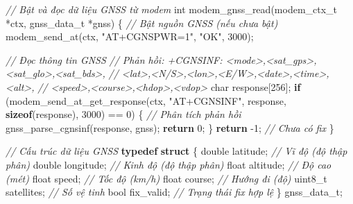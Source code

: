 \documentclass[a4paper]{extarticle}
\newenvironment{Shaded}{}{}
\newcommand{\CommentTok}[1]{\textcolor[rgb]{0.38,0.63,0.69}{\textit{#1}}}
\newcommand{\ControlFlowTok}[1]{\textcolor[rgb]{0.00,0.44,0.13}{\textbf{#1}}}
\newcommand{\DataTypeTok}[1]{\textcolor[rgb]{0.56,0.13,0.00}{#1}}
\newcommand{\DecValTok}[1]{\textcolor[rgb]{0.25,0.63,0.44}{#1}}
\newcommand{\KeywordTok}[1]{\textcolor[rgb]{0.00,0.44,0.13}{\textbf{#1}}}
\newcommand{\NormalTok}[1]{#1}
\newcommand{\OperatorTok}[1]{\textcolor[rgb]{0.40,0.40,0.40}{#1}}
\newcommand{\StringTok}[1]{\textcolor[rgb]{0.25,0.44,0.63}{#1}}
\begin{document}
\begin{Shaded}
\begin{Highlighting}[]
\CommentTok{// Bật và đọc dữ liệu GNSS từ modem}
\DataTypeTok{int}\NormalTok{ modem\_gnss\_read}\OperatorTok{(}\NormalTok{modem\_ctx\_t }\OperatorTok{*}\NormalTok{ctx}\OperatorTok{,}\NormalTok{ gnss\_data\_t }\OperatorTok{*}\NormalTok{gnss}\OperatorTok{)}
\OperatorTok{\{}
    \CommentTok{// Bật nguồn GNSS (nếu chưa bật)}
\NormalTok{    modem\_send\_at}\OperatorTok{(}\NormalTok{ctx}\OperatorTok{,} \StringTok{"AT+CGNSPWR=1"}\OperatorTok{,} \StringTok{"OK"}\OperatorTok{,} \DecValTok{3000}\OperatorTok{);}

    \CommentTok{// Đọc thông tin GNSS}
    \CommentTok{// Phản hồi: +CGNSINF: \textless{}mode\textgreater{},\textless{}sat\_gps\textgreater{},\textless{}sat\_glo\textgreater{},\textless{}sat\_bds\textgreater{},}
    \CommentTok{//           \textless{}lat\textgreater{},\textless{}N/S\textgreater{},\textless{}lon\textgreater{},\textless{}E/W\textgreater{},\textless{}date\textgreater{},\textless{}time\textgreater{},\textless{}alt\textgreater{},}
    \CommentTok{//           \textless{}speed\textgreater{},\textless{}course\textgreater{},\textless{}hdop\textgreater{},\textless{}vdop\textgreater{}}
    \DataTypeTok{char}\NormalTok{ response}\OperatorTok{[}\DecValTok{256}\OperatorTok{];}
    \ControlFlowTok{if} \OperatorTok{(}\NormalTok{modem\_send\_at\_get\_response}\OperatorTok{(}\NormalTok{ctx}\OperatorTok{,} \StringTok{"AT+CGNSINF"}\OperatorTok{,}
\NormalTok{                                    response}\OperatorTok{,} \KeywordTok{sizeof}\OperatorTok{(}\NormalTok{response}\OperatorTok{),}
                                    \DecValTok{3000}\OperatorTok{)} \OperatorTok{==} \DecValTok{0}\OperatorTok{)} \OperatorTok{\{}
        \CommentTok{// Phân tích phản hồi}
\NormalTok{        gnss\_parse\_cgnsinf}\OperatorTok{(}\NormalTok{response}\OperatorTok{,}\NormalTok{ gnss}\OperatorTok{);}
        \ControlFlowTok{return} \DecValTok{0}\OperatorTok{;}
    \OperatorTok{\}}
    \ControlFlowTok{return} \OperatorTok{{-}}\DecValTok{1}\OperatorTok{;}  \CommentTok{// Chưa có fix}
\OperatorTok{\}}

\CommentTok{// Cấu trúc dữ liệu GNSS}
\KeywordTok{typedef} \KeywordTok{struct} \OperatorTok{\{}
    \DataTypeTok{double}\NormalTok{   latitude}\OperatorTok{;}      \CommentTok{// Vĩ độ (độ thập phân)}
    \DataTypeTok{double}\NormalTok{   longitude}\OperatorTok{;}     \CommentTok{// Kinh độ (độ thập phân)}
    \DataTypeTok{float}\NormalTok{    altitude}\OperatorTok{;}      \CommentTok{// Độ cao (mét)}
    \DataTypeTok{float}\NormalTok{    speed}\OperatorTok{;}         \CommentTok{// Tốc độ (km/h)}
    \DataTypeTok{float}\NormalTok{    course}\OperatorTok{;}        \CommentTok{// Hướng đi (độ)}
    \DataTypeTok{uint8\_t}\NormalTok{  satellites}\OperatorTok{;}    \CommentTok{// Số vệ tinh}
    \DataTypeTok{bool}\NormalTok{     fix\_valid}\OperatorTok{;}     \CommentTok{// Trạng thái fix hợp lệ}
\OperatorTok{\}}\NormalTok{ gnss\_data\_t}\OperatorTok{;}
\end{Highlighting}
\end{Shaded}
\end{document}
